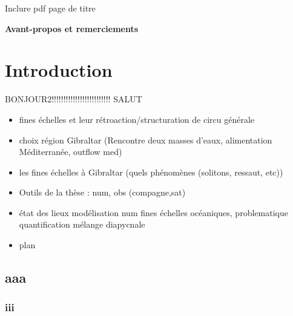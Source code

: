 \documentclass[a4paper,12pt,notitlepage]{report}
\numberwithin{equation}{section}
\begin{document}

\hypersetup{pdfborder=0 0 0}%
\let\noparref\ref
\renewcommand{\ref}[1]{(\noparref{#1})}

\setcounter{tocdepth}{3}%

Inclure pdf page de titre

\newpage
\textbf{Avant-propos et remerciements}
\newpage
\tableofcontents


\newpage
\chapter{Introduction}
\cite{BS84}
BONJOUR2!!!!!!!!!!!!!!!!!!!!!!!!!
SALUT
\begin{itemize}
\item fines échelles et leur rétroaction/structuration de circu générale
\item choix région Gibraltar (Rencontre deux masses d'eaux, alimentation Méditerranée, outflow med)
\item les fines échelles à Gibraltar (quels phénomènes (solitons, ressaut, etc))
\item Outils de la thèse : num, obs (compagne,sat)
\item état des lieux modélisation num fines échelles océaniques, problematique quantification mélange diapycnale
\item plan
\end{itemize}

\section{aaa}

\subsection{iii}
\end{document}
